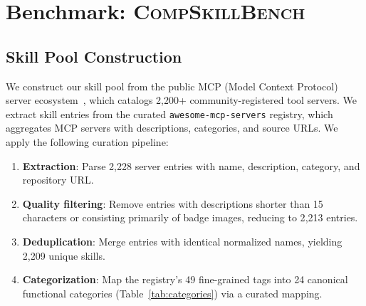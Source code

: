 \documentclass[11pt]{article}
\newcommand{\benchmark}{\textsc{CompSkillBench}}
\begin{document}
\section{Benchmark: \benchmark{}}
\label{sec:benchmark}

\subsection{Skill Pool Construction}

We construct our skill pool from the public MCP (Model Context Protocol) server ecosystem~\cite{anthropic2024mcp}, which catalogs 2,200+ community-registered tool servers.
We extract skill entries from the curated \texttt{awesome-mcp-servers} registry, which aggregates MCP servers with descriptions, categories, and source URLs.
We apply the following curation pipeline:

\begin{enumerate}[nosep,leftmargin=*]
  \item \textbf{Extraction}: Parse 2{,}228 server entries with name, description, category, and repository URL.
  \item \textbf{Quality filtering}: Remove entries with descriptions shorter than 15 characters or consisting primarily of badge images, reducing to 2{,}213 entries.
  \item \textbf{Deduplication}: Merge entries with identical normalized names, yielding 2{,}209 unique skills.
  \item \textbf{Categorization}: Map the registry's 49 fine-grained tags into 24 canonical functional categories (Table~\ref{tab:categories}) via a curated mapping.
\end{enumerate}
\end{document}
